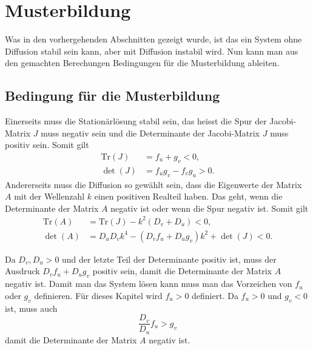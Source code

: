 \section{Musterbildung
\label{reaktdiff:section:diffusioninduzierteInstabilitaet}}
Was in den vorhergehenden Abschnitten gezeigt wurde, ist das ein System ohne Diffusion stabil sein kann, aber mit Diffusion instabil wird.
Nun kann man aus den gemachten Berechungen Bedingungen für die Musterbildung ableiten.

\subsection{Bedingung für die Musterbildung}
Einerseits muss die Stationärlösung stabil sein, das heisst die Spur der Jacobi-Matrix \(J\) muss negativ sein und die Determinante der Jacobi-Matrix \(J\) muss positiv sein.
Somit gilt
\begin{align*}
    \text{Tr}(J) &= f_u + g_v < 0,
    \\
    \det(J) &= f_u g_v - f_v g_u > 0.
\end{align*}
Andererseits muss die Diffusion so gewählt sein, dass die Eigenwerte der Matrix \(A\) mit der Wellenzahl \(k\) einen positiven Realteil haben.
Das geht, wenn die Determinante der Matrix \(A\) negativ ist oder wenn die Spur negativ ist.
Somit gilt
\begin{align}
    \text{Tr}(A) &= \text{Tr}(J) - k^2(D_v + D_u)  < 0, \\
    \det(A) &= D_u D_v k^4 - (D_v f_u + D_u g_v)k^2 + \det(J) < 0.
    \label{reaktdiff:equation:reaktdiffbedingunen}
\end{align}

Da \(D_v,D_u > 0\) und der letzte Teil der Determinante positiv ist, muss der Ausdruck \(D_v f_u + D_u g_v\) positiv sein, damit die Determinante der Matrix \(A\) negativ ist.
Damit man das System lösen kann muss man das Vorzeichen von \(f_u\) oder \(g_v\) definieren.
Für dieses Kapitel wird \(f_u > 0\) definiert.
Da \(f_u > 0\) und \(g_v < 0\) ist, muss auch
\begin{equation*}
    \frac{D_v}{D_u}f_u > g_v
\end{equation*}
damit die Determinante der Matrix \(A\) negativ ist.

